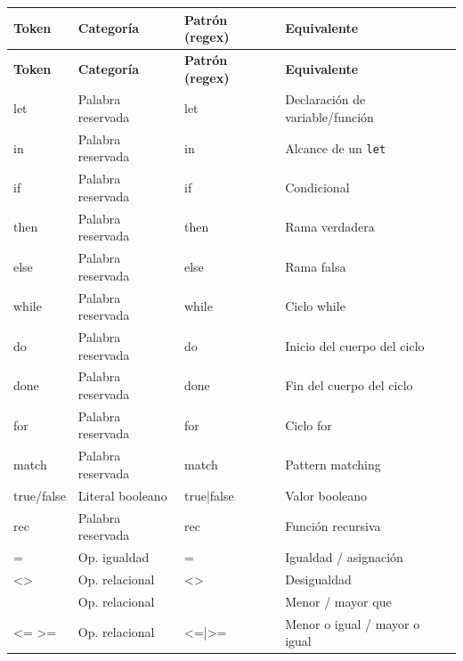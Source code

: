 \documentclass[12pt,a4paper]{article}
\begin{document}
\begin{center}
\renewcommand{\arraystretch}{1.25}
\begin{longtable}{>{\ttfamily}p{2.8cm} p{3.5cm} >{\ttfamily}p{4cm} p{3.5cm}}
\toprule
\normalfont\textbf{Token} & \textbf{Categoría} & \normalfont\textbf{Patrón (regex)} & \textbf{Equivalente} \\
\midrule
\endfirsthead
\toprule
\normalfont\textbf{Token} & \textbf{Categoría} & \normalfont\textbf{Patrón (regex)} & \textbf{Equivalente} \\
\midrule
\endhead
\bottomrule
\endfoot

let        & Palabra reservada    & let                          & Declaración de variable/función \\
in         & Palabra reservada    & in                           & Alcance de un \texttt{let} \\
if         & Palabra reservada    & if                           & Condicional \\
then       & Palabra reservada    & then                         & Rama verdadera \\
else       & Palabra reservada    & else                         & Rama falsa \\
while      & Palabra reservada    & while                        & Ciclo while \\
do         & Palabra reservada    & do                           & Inicio del cuerpo del ciclo \\
done       & Palabra reservada    & done                         & Fin del cuerpo del ciclo \\
for        & Palabra reservada    & for                          & Ciclo for \\
match      & Palabra reservada    & match                        & Pattern matching \\
true/false & Literal booleano     & true|false                   & Valor booleano \\
rec        & Palabra reservada    & rec                          & Función recursiva \\
=          & Op. igualdad         & =                            & Igualdad / asignación \\
<>         & Op. relacional       & <>                           & Desigualdad \\
< >        & Op. relacional       & [<>]                         & Menor / mayor que \\
<= >=      & Op. relacional       & <=|>=                        & Menor o igual / mayor o igual \\

\end{longtable}
\end{center}
\end{document}
